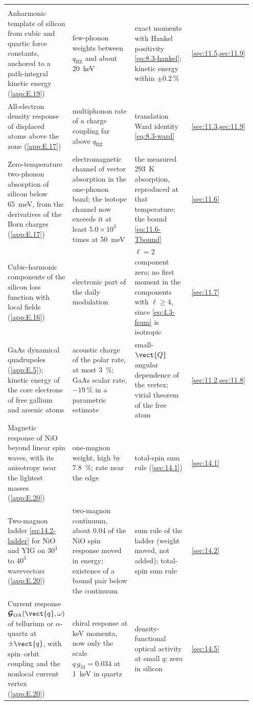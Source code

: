 {\begin{longtable}{@{}>{\raggedright\arraybackslash}p{0.25\linewidth}>{\raggedright\arraybackslash}p{0.305\linewidth}>{\raggedright\arraybackslash}p{0.305\linewidth}>{\raggedright\arraybackslash}p{0.09\linewidth}@{}}
  \midrule
  \multicolumn{4}{@{}l}{\emph{Lattice, spin, superconducting and novel targets}} \\
  Anharmonic template of silicon from cubic and quartic force constants, anchored to a path-integral kinetic energy (\cref{app:E.19}) & few-phonon weights between $q_{\mathrm{BZ}}$ and about \SI{20}{keV} & exact moments with Hankel positivity \cref{eq:8.3-hankel}; kinetic energy within $\pm\SI{0.2}{\percent}$ & \cref{sec:11.5,sec:11.9} \\
  All-electron density response of displaced atoms above the zone (\cref{app:E.17}) & multiphonon rate of a charge coupling far above $q_{\mathrm{BZ}}$ & translation Ward identity \cref{eq:8.3-ward} & \cref{sec:11.3,sec:11.9} \\
  Zero-temperature two-phonon absorption of silicon below \SI{65}{meV}, from the derivatives of the Born charges (\cref{app:E.17}) & electromagnetic channel of vector absorption in the one-phonon band; the isotope channel now exceeds it at least $5.0\times10^3$ times at \SI{50}{meV} & the measured \SI{293}{K} absorption, reproduced at that temperature; the bound \cref{eq:11.6-Tbound} & \cref{sec:11.6} \\
  Cubic-harmonic components of the silicon loss function with local fields (\cref{app:E.16}) & electronic part of the daily modulation & $\ell = 2$ component zero; no first moment in the components with $\ell \ge 4$, since \cref{eq:4.3-fsum} is isotropic & \cref{sec:11.7} \\
  GaAs dynamical quadrupoles (\cref{app:E.5}); kinetic energy of the core electrons of free gallium and arsenic atoms & acoustic charge of the polar rate, at most \SI{3}{\percent}; GaAs scalar rate, $-\SI{19}{\percent}$ in a parametric estimate & small-$\vect{Q}$ angular dependence of the vertex; virial theorem of the free atom & \cref{sec:11.2,sec:11.8} \\
  Magnetic response of NiO beyond linear spin waves, with its anisotropy near the lightest masses (\cref{app:E.20}) & one-magnon weight, high by \SI{7.8}{\percent}; rate near the edge & total-spin sum rule (\cref{sec:14.1}) & \cref{sec:14.1} \\
  Two-magnon ladder \cref{eq:14.2-ladder} for NiO and YIG on $30^3$ to $40^3$ wavevectors (\cref{app:E.20}) & two-magnon continuum, about 0.04 of the NiO spin response moved in energy; existence of a bound pair below the continuum & sum rule of the ladder (weight moved, not added); total-spin sum rule & \cref{sec:14.2} \\
  Current response $\boldsymbol{\mathcal{G}}_{\mathrm{OA}}(\vect{q},\omega)$ of tellurium or $\alpha$-quartz at $\pm\vect{q}$, with spin--orbit coupling and the nonlocal current vertex (\cref{app:E.20}) & chiral response at keV momenta, now only the scale $q\,g_{33} = 0.034$ at \SI{1}{keV} in quartz & density-functional optical activity at small $q$; zero in silicon & \cref{sec:14.5} \\

\end{longtable}}
